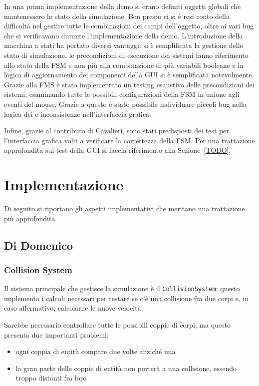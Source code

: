 In una prima implementazione della demo si erano definiti oggetti globali che mantenessero lo stato della simulazione.
Ben presto ci si è resi conto della difficoltà nel gestire tutte le combinazioni dei campi dell'oggetto, oltre
ai vari bug che si verificavano durante l'implementazione della demo.
L'introduzione della macchina a stati ha portato diversi vantaggi: si è semplificata la gestione dello
stato di simulazione, le precondizioni di esecuzione dei sistemi fanno riferimento allo stato della FSM e non più alla
combinazione di più variabili booleane e la logica di aggiornamento dei componenti della GUI si è semplificata
notevolmente.
Grazie alla FMS è stato implementato un testing esaustivo delle precondizioni dei sistemi, esaminando tutte
le possibili configurazioni della FSM in unione agli eventi del mouse.
Grazie a questo è stato possibile individuare piccoli bug nella logica dei \System e inconsistenze nell'interfaccia
grafica.

Infine, grazie al contributo di Cavalieri, sono stati predisposti dei test per l'interfaccia grafica volti a verificare
la correttezza della FSM. Per una trattazione approfondita sui test della GUI si faccia riferimento alla
Sezione~\ref{TODO}.

\section{Implementazione}\label{sec:demo-implementazione}

Di seguito si riportano gli aspetti implementativi che meritano una trattazione più approfondita.

\subsection{Di Domenico}\label{subsec:demo-di-domenico}

\subsubsection{Collision System}\label{subsec:container}
Il sistema principale che gestisce la simulazione è il \texttt{CollisionSystem}: questo implementa i calcoli necessari
per testare se c'è una collisione fra due corpi e, in caso affermativo, calcolarne le nuove velocità.

Sarebbe necessario controllare tutte le possibili coppie di corpi, ma questo presenta due importanti problemi:
\begin{itemize}
    \item ogni coppia di entità compare due volte anziché una
    \item la gran parte delle coppie di entità non porterà a una collisione, essendo troppo distanti fra loro
\end{itemize}

